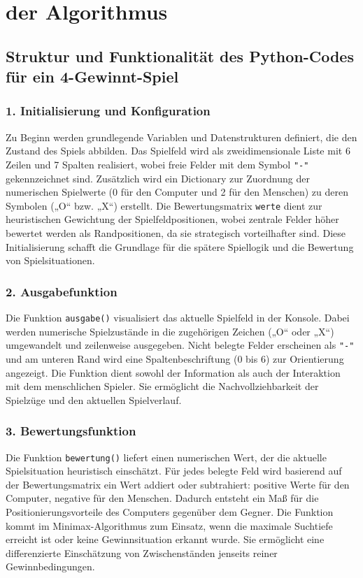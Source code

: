 \chapter{der Algorithmus}
\section*{Struktur und Funktionalität des Python-Codes für ein 4-Gewinnt-Spiel}

\subsection*{1. Initialisierung und Konfiguration}

Zu Beginn werden grundlegende Variablen und Datenstrukturen definiert, die den Zustand des Spiels abbilden. Das Spielfeld wird als zweidimensionale Liste mit 6 Zeilen und 7 Spalten realisiert, wobei freie Felder mit dem Symbol \texttt{"-"} gekennzeichnet sind. Zusätzlich wird ein Dictionary zur Zuordnung der numerischen Spielwerte (0 für den Computer und 2 für den Menschen) zu deren Symbolen („O“ bzw. „X“) erstellt. Die Bewertungsmatrix \texttt{werte} dient zur heuristischen Gewichtung der Spielfeldpositionen, wobei zentrale Felder höher bewertet werden als Randpositionen, da sie strategisch vorteilhafter sind. Diese Initialisierung schafft die Grundlage für die spätere Spiellogik und die Bewertung von Spielsituationen.

\subsection*{2. Ausgabefunktion}

Die Funktion \texttt{ausgabe()} visualisiert das aktuelle Spielfeld in der Konsole. Dabei werden numerische Spielzustände in die zugehörigen Zeichen („O“ oder „X“) umgewandelt und zeilenweise ausgegeben. Nicht belegte Felder erscheinen als \texttt{"-"} und am unteren Rand wird eine Spaltenbeschriftung (0 bis 6) zur Orientierung angezeigt. Die Funktion dient sowohl der Information als auch der Interaktion mit dem menschlichen Spieler. Sie ermöglicht die Nachvollziehbarkeit der Spielzüge und den aktuellen Spielverlauf.

\subsection*{3. Bewertungsfunktion}

Die Funktion \texttt{bewertung()} liefert einen numerischen Wert, der die aktuelle Spielsituation heuristisch einschätzt. Für jedes belegte Feld wird basierend auf der Bewertungsmatrix ein Wert addiert oder subtrahiert: positive Werte für den Computer, negative für den Menschen. Dadurch entsteht ein Maß für die Positionierungsvorteile des Computers gegenüber dem Gegner. Die Funktion kommt im Minimax-Algorithmus zum Einsatz, wenn die maximale Suchtiefe erreicht ist oder keine Gewinnsituation erkannt wurde. Sie ermöglicht eine differenzierte Einschätzung von Zwischenständen jenseits reiner Gewinnbedingungen.

